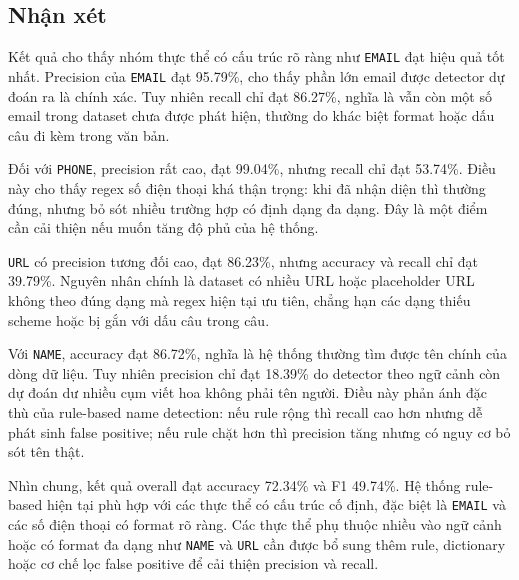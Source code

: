 \subsection{Nhận xét}

Kết quả cho thấy nhóm thực thể có cấu trúc rõ ràng như \texttt{EMAIL} đạt hiệu
quả tốt nhất. Precision của \texttt{EMAIL} đạt 95.79\%, cho thấy phần lớn email
được detector dự đoán ra là chính xác. Tuy nhiên recall chỉ đạt 86.27\%, nghĩa
là vẫn còn một số email trong dataset chưa được phát hiện, thường do khác biệt
format hoặc dấu câu đi kèm trong văn bản.

Đối với \texttt{PHONE}, precision rất cao, đạt 99.04\%, nhưng recall chỉ đạt
53.74\%. Điều này cho thấy regex số điện thoại khá thận trọng: khi đã nhận diện
thì thường đúng, nhưng bỏ sót nhiều trường hợp có định dạng đa dạng. Đây là một
điểm cần cải thiện nếu muốn tăng độ phủ của hệ thống.

\texttt{URL} có precision tương đối cao, đạt 86.23\%, nhưng accuracy và recall
chỉ đạt 39.79\%. Nguyên nhân chính là dataset có nhiều URL hoặc placeholder URL
không theo đúng dạng mà regex hiện tại ưu tiên, chẳng hạn các dạng thiếu scheme
hoặc bị gắn với dấu câu trong câu.

Với \texttt{NAME}, accuracy đạt 86.72\%, nghĩa là hệ thống thường tìm được tên
chính của dòng dữ liệu. Tuy nhiên precision chỉ đạt 18.39\% do detector theo
ngữ cảnh còn dự đoán dư nhiều cụm viết hoa không phải tên người. Điều này phản
ánh đặc thù của rule-based name detection: nếu rule rộng thì recall cao hơn
nhưng dễ phát sinh false positive; nếu rule chặt hơn thì precision tăng nhưng
có nguy cơ bỏ sót tên thật.

Nhìn chung, kết quả overall đạt accuracy 72.34\% và F1 49.74\%. Hệ thống
rule-based hiện tại phù hợp với các thực thể có cấu trúc cố định, đặc biệt là
\texttt{EMAIL} và các số điện thoại có format rõ ràng. Các thực thể phụ thuộc
nhiều vào ngữ cảnh hoặc có format đa dạng như \texttt{NAME} và \texttt{URL} cần
được bổ sung thêm rule, dictionary hoặc cơ chế lọc false positive để cải thiện
precision và recall.
